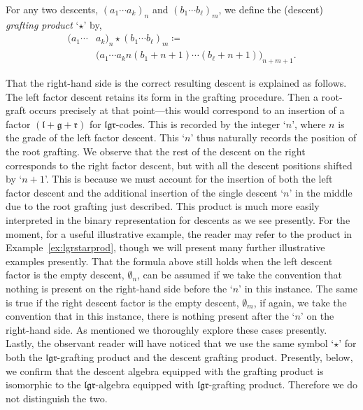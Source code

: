 \documentclass[5p,twocolumn]{elsarticle}
\newcommand*{\el}{\mathfrak l}
\newcommand*{\gl}{\mathfrak g}
\newcommand*{\rl}{\mathfrak r}
\begin{document}
%
\begin{definition}\label{def:descentgrafting}
  For any two descents, $(a_1\cdots a_k)_n$ and $(b_1\cdots b_\ell)_m$, we define the (descent) \emph{grafting product} `$\star$' by,
  \begin{align*}
    (a_1\cdots& a_k)_n\star(b_1\cdots b_\ell)_m\coloneqq\\
              &\bigl(a_1\cdots a_kn(b_1+n+1)\cdots(b_\ell+n+1)\bigr)_{n+m+1}.
  \end{align*}
\end{definition}
%
\begin{remark}
  That the right-hand side is the correct resulting descent is explained as follows. The left factor descent retains its form in the grafting procedure.
  Then a root-graft occurs precisely at that point---this would correspond to an insertion of a factor $(\el+\gl+\rl)$ for $\el\gl\rl$-codes.
  This is recorded by the integer `$n$', where $n$ is the grade of the left factor descent.
  This `$n$' thus naturally records the position of the root grafting. We observe that the rest of the descent on the right corresponds to the
  right factor descent, but with all the descent positions shifted by `$n+1$'.
  This is because we must account for the insertion of both the left factor descent and the additional insertion of the single descent `$n$' in the middle due to the root grafting just described.
  This product is much more easily interpreted in the binary representation for descents as we see presently.
  For the moment, for a useful illustrative example, the reader may refer to the product in Example~\ref{ex:lgrstarprod}, though we will present many further illustrative examples presently.
  That the formula above still holds when the left descent factor is the empty descent, $\emptyset_n$, can be assumed if we take the convention that nothing is present on the right-hand side before the `$n$' in this instance. 
  The same is true if the right descent factor is the empty descent, $\emptyset_m$, if again, we take the convention that in this instance, there is nothing present after the `$n$' on the right-hand side.
  As mentioned we thoroughly explore these cases presently. 
  Lastly, the observant reader will have noticed that we use the same symbol `$\star$' for both the $\el\gl\rl$-grafting product and the descent grafting product.
  Presently, below, we confirm that the descent algebra equipped with the grafting product is isomorphic to the $\el\gl\rl$-algebra equipped with $\el\gl\rl$-grafting product.
  Therefore we do not distinguish the two.
\end{remark}
\end{document}
